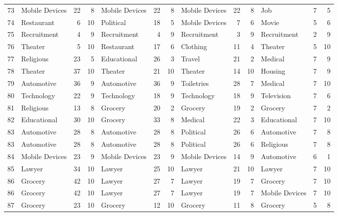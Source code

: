 \begin{figure}[htbp]
\begin{tabular}{rlrrlrrlrrlrr}
    73    & Mobile Devices & 22    & 8     & Mobile Devices & 22    & 8     & Mobile Devices & 22    & 8     & Job   & 7     & 5 \\
    74    & Restaurant & 6     & 10    & Political & 18    & 5     & Mobile Devices & 7     & 6     & Movie & 5     & 6 \\
    75    & Recruitment & 4     & 9     & Recruitment & 4     & 9     & Recruitment & 3     & 9     & Recruitment & 2     & 9 \\
    76    & Theater & 5     & 10    & Restaurant & 17    & 6     & Clothing & 11    & 4     & Theater & 5     & 10 \\
    77    & Religious & 23    & 5     & Educational & 26    & 3     & Travel & 21    & 2     & Medical & 7     & 9 \\
    78    & Theater & 37    & 10    & Theater & 21    & 10    & Theater & 14    & 10    & Housing & 7     & 9 \\
    79    & Automotive & 36    & 9     & Automotive & 36    & 9     & Toiletries & 28    & 7     & Medical & 7     & 10 \\
    80    & Technology & 22    & 9     & Technology & 18    & 9     & Technology & 18    & 9     & Television & 7     & 6 \\
    81    & Religious & 13    & 8     & Grocery & 20    & 2     & Grocery & 19    & 2     & Grocery & 7     & 2 \\
    82    & Educational & 30    & 10    & Grocery & 33    & 8     & Medical & 22    & 3     & Educational & 7     & 10 \\
    83    & Automotive & 28    & 8     & Automotive & 28    & 8     & Political & 26    & 6     & Automotive & 7     & 8 \\
    83    & Automotive & 28    & 8     & Automotive & 28    & 8     & Political & 26    & 6     & Religious & 7     & 8 \\
    84    & Mobile Devices & 23    & 9     & Mobile Devices & 23    & 9     & Mobile Devices & 14    & 9     & Automotive & 6     & 1 \\
    85    & Lawyer & 34    & 10    & Lawyer & 25    & 10    & Lawyer & 21    & 10    & Lawyer & 7     & 10 \\
    86    & Grocery & 42    & 10    & Lawyer & 27    & 7     & Lawyer & 19    & 7     & Grocery & 7     & 10 \\
    86    & Grocery & 42    & 10    & Lawyer & 27    & 7     & Lawyer & 19    & 7     & Mobile Devices & 7     & 10 \\
    87    & Grocery & 23    & 10    & Grocery & 12    & 10    & Grocery & 11    & 8     & Grocery & 5     & 8 \\

\end{tabular}
\end{figure}
